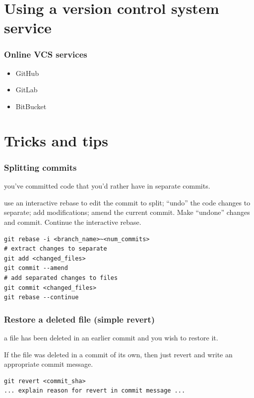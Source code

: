 \documentclass{git_course}
\begin{document}
\section{Using a version control system service}

\begin{frame}
    \frametitle{Online VCS services}
    \begin{itemize}
        \item GitHub
        \item GitLab
        \item BitBucket
    \end{itemize}
\end{frame}


\section{Tricks and tips}

\begin{frame}[fragile]
    \frametitle{Splitting commits}
     you've committed code that you'd rather have in
        separate commits.

     use an interactive rebase to edit the commit
        to split; ``undo'' the code changes to separate; add
        modifications; amend the current commit.
        Make ``undone'' changes and commit.  Continue
        the interactive rebase.
\begin{lstlisting}
git rebase -i <branch_name>~<num_commits>
# extract changes to separate
git add <changed_files>
git commit --amend
# add separated changes to files
git commit <changed_files>
git rebase --continue
\end{lstlisting}

\end{frame}

\begin{frame}[fragile]
    \frametitle{Restore a deleted file (simple revert)}
     a file has been deleted in an earlier commit and you wish
    to restore it.

     If the file was deleted in a commit of its own, then
    just revert and write an appropriate commit message.
\begin{lstlisting}
git revert <commit_sha>
... explain reason for revert in commit message ...
\end{lstlisting}
\end{frame}
\end{document}
